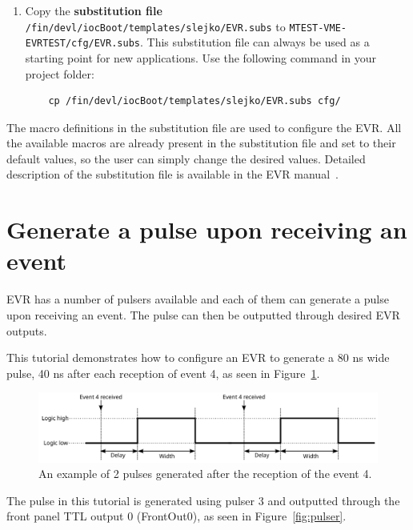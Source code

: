 \documentclass[12pt,a4paper]{article}
\begin{document}
\begin{enumerate}
	\item Copy the \textbf{substitution file} \texttt{/fin/devl/iocBoot/templates/slejko/EVR.subs} to \texttt{MTEST-VME-EVRTEST/cfg/EVR.subs}. This substitution file can always be used as a starting point for new applications. Use the following command in your project folder: 
\begin{verbatim}
	cp /fin/devl/iocBoot/templates/slejko/EVR.subs cfg/
\end{verbatim}
\end{enumerate}

The macro definitions in the substitution file are used to configure the EVR. All the available macros are already present in the substitution file and set to their default values, so the user can simply change the desired values. Detailed description of the substitution file is available in the EVR manual~\cite{evr_manual}.


\section{Generate a pulse upon receiving an event}
EVR has a number of pulsers available and each of them can generate a pulse upon receiving an event. The pulse can then be outputted through desired EVR outputs. 

This tutorial demonstrates how to configure an EVR to generate a 80 ns wide pulse, 40 ns after each reception of event 4, as seen in Figure~\ref{fig:pulser_signal}. 
\begin{figure}[H]
	\centering
	\includegraphics[width=\columnwidth]{./img/pulserSignal}
	\caption{An example of 2 pulses generated after the reception of the event 4.}
	\label{fig:pulser_signal}
\end{figure}
The pulse in this tutorial is generated using pulser 3 and outputted through the front panel TTL output 0 (FrontOut0), as seen in Figure~\ref{fig:pulser}. 
\end{document}
